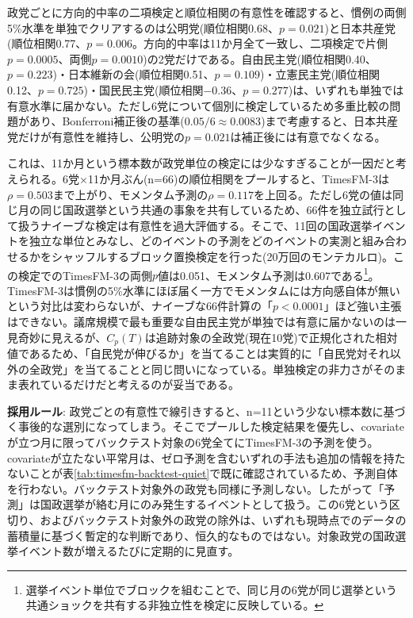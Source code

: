 \documentclass[a4paper,11pt]{ltjsarticle}
\begin{document}
政党ごとに方向的中率の二項検定と順位相関の有意性を確認すると、慣例の両側5\%水準を単独でクリアするのは公明党(順位相関0.68、$p=0.021$)と日本共産党(順位相関0.77、$p=0.006$。方向的中率は11か月全て一致し、二項検定で片側$p=0.0005$、両側$p=0.0010$)の2党だけである。自由民主党(順位相関0.40、$p=0.223$)・日本維新の会(順位相関0.51、$p=0.109$)・立憲民主党(順位相関0.12、$p=0.725$)・国民民主党(順位相関$-0.36$、$p=0.277$)は、いずれも単独では有意水準に届かない。ただし6党について個別に検定しているため多重比較の問題があり、Bonferroni補正後の基準($0.05/6\approx0.0083$)まで考慮すると、日本共産党だけが有意性を維持し、公明党の$p=0.021$は補正後には有意でなくなる。

これは、11か月という標本数が政党単位の検定には少なすぎることが一因だと考えられる。6党×11か月ぶん(n=66)の順位相関をプールすると、TimesFM-3は$\rho=0.503$まで上がり、モメンタム予測の$\rho=0.117$を上回る。ただし6党の値は同じ月の同じ国政選挙という共通の事象を共有しているため、66件を独立試行として扱うナイーブな検定は有意性を過大評価する。そこで、11回の国政選挙イベントを独立な単位とみなし、どのイベントの予測をどのイベントの実測と組み合わせるかをシャッフルするブロック置換検定を行った(20万回のモンテカルロ)。この検定でのTimesFM-3の両側$p$値は0.051、モメンタム予測は0.607である\footnote{選挙イベント単位でブロックを組むことで、同じ月の6党が同じ選挙という共通ショックを共有する非独立性を検定に反映している。}。TimesFM-3は慣例の5\%水準にほぼ届く一方でモメンタムには方向感自体が無いという対比は変わらないが、ナイーブな66件計算の「$p<0.0001$」ほど強い主張はできない。議席規模で最も重要な自由民主党が単独では有意に届かないのは一見奇妙に見えるが、$C_p(T)$は追跡対象の全政党(現在10党)で正規化された相対値であるため、「自民党が伸びるか」を当てることは実質的に「自民党対それ以外の全政党」を当てることと同じ問いになっている。単独検定の非力さがそのまま表れているだけだと考えるのが妥当である。

\textbf{採用ルール}: 政党ごとの有意性で線引きすると、n=11という少ない標本数に基づく事後的な選別になってしまう。そこでプールした検定結果を優先し、covariateが立つ月に限ってバックテスト対象の6党全てにTimesFM-3の予測を使う。covariateが立たない平常月は、ゼロ予測を含むいずれの手法も追加の情報を持たないことが表\ref{tab:timesfm-backtest-quiet}で既に確認されているため、予測自体を行わない。バックテスト対象外の政党も同様に予測しない。したがって「予測」は国政選挙が絡む月にのみ発生するイベントとして扱う。この6党という区切り、およびバックテスト対象外の政党の除外は、いずれも現時点でのデータの蓄積量に基づく暫定的な判断であり、恒久的なものではない。対象政党の国政選挙イベント数が増えるたびに定期的に見直す。
\end{document}
